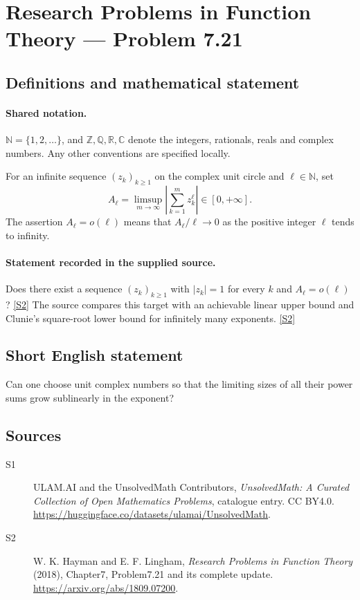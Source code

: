 \documentclass[11pt]{article}
\newcommand{\sref}[2]{\hyperlink{source:#1:#2}{[S#2]}}
\begin{document}
\section{Research Problems in Function Theory — Problem 7.21}\label{statement}

\subsection{Definitions and mathematical statement}

\paragraph{Shared notation.}$\mathbb N=\{1,2,\ldots\}$, and $\mathbb Z,\mathbb Q,\mathbb R,\mathbb C$ denote the integers, rationals, reals and complex numbers. Any other conventions are specified locally.


For an infinite sequence $(z_k)_{k\ge1}$ on the complex unit circle and $\ell\in\mathbb N$, set
\[A_\ell=\limsup_{m\to\infty}\left|\sum_{k=1}^m z_k^\ell\right|\in[0,+\infty].\]
The assertion $A_\ell=o(\ell)$ means that $A_\ell/\ell\to0$ as the positive integer $\ell$ tends to infinity.

\paragraph{Statement recorded in the supplied source.}
Does there exist a sequence $(z_k)_{k\ge1}$ with $|z_k|=1$ for every $k$ and $A_\ell=o(\ell)$? \sref{statement}{2}
The source compares this target with an achievable linear upper bound and Clunie's square-root lower bound for infinitely many exponents. \sref{statement}{2}
\subsection{Short English statement}
Can one choose unit complex numbers so that the limiting sizes of all their power sums grow sublinearly in the exponent?
\subsection{Sources}
\begin{description}
\item[\hypertarget{source:statement:1}{S1}] ULAM.AI and the UnsolvedMath Contributors, \emph{UnsolvedMath: A Curated Collection of Open Mathematics Problems}, catalogue entry. CC BY4.0. \url{https://huggingface.co/datasets/ulamai/UnsolvedMath}.
\item[\hypertarget{source:statement:2}{S2}] W. K. Hayman and E. F. Lingham, \emph{Research Problems in Function Theory} (2018), Chapter7, Problem7.21 and its complete update. \url{https://arxiv.org/abs/1809.07200}.
\end{description}
\label{end:statement}
\end{document}
